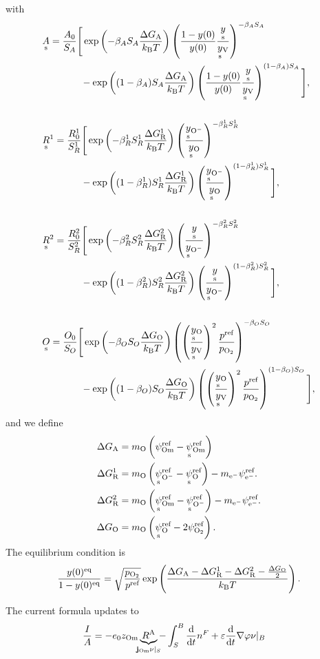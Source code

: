 \documentclass{article}
\numberwithin{equation}{section}
\newcommand{\us}[1]{\underset{\textrm{s}}{#1}{}}
\def\kB{k_\mathrm{B}}
\def\Ox{\mathrm{O}}
\newcommand{\Omin}{{\ce{O-}}}
\def\Om{\mathrm{Om}}
\newcommand{\OO}{{\ce{O2}}}
\newcommand{\dd}{{\mathrm{d}}}
\def\eM{\mathrm{e^-}}
\def\ys{\us y}
\newcommand{\ysV}{\us y_{\textrm{V}}}
\newcommand{\yOmin}{\us y_{\ce{O-}}}
\def\y0{y(0)}
\def\yOs{\us y_\textrm{O}}
\def\A0{A_0}
\def\R0{R_0}
\def\K0{O_0}
\def\DGA{\Delta G_\textrm{A}  }
\def\DGR{\Delta G_\textrm{R}  }
\def\DGO{\Delta G_\textrm{O}  }
\def\betaA{\beta_A}
\def\betaR{\beta_R}
\def\betaO{\beta_O}
\def\SA{S_A}
\def\SR{S_R}
\def\SO{S_O}
\def\eq{\textrm{eq}}
\def\REF{\textrm{ref}}
\begin{document}
with
\begin{subequations}
\begin{align}
&\us A
=
\frac{\A0}{\SA}
\Bigg[
	\exp
	\left(
		{-\betaA \SA \frac{\DGA}{\kB T}}
	\right)
	\left(
		\frac{1 - \y0}{\y0}
		\frac{\ys}{\ysV}
	\right)^{-\betaA \SA}
\\ \nonumber
	&\quad \quad \quad \quad	
	-
	\exp
	\left(
		{(1-\betaA) \SA \frac{\DGA}{\kB T}}
	\right)
	\left(
		\frac{1 - \y0 }{\y0}
		\frac{\ys}{\ysV}
	\right)^{(1-\betaA) \SA}
\Bigg],
\\ \nonumber
\\
&\us R^1
=
\frac{\R0^1}{\SR^1}
\Bigg[
	\exp
	\left(
		{-\betaR^1 \SR^1 \frac{\DGR^1}{\kB T}}
	\right)
	\left(
		\frac{\yOmin}{\yOs}
	\right)^{-\betaR^1 \SR^1}
\\ \nonumber
	& \quad \quad \quad \quad	
	-
	\exp
	\left(
		{(1 - \betaR^1) \SR^1 \frac{\DGR^1}{\kB T}}
	\right)
	\left(
		\frac{\yOmin}{\yOs}
	\right)^{(1-\betaR^1) \SR^1}
\Bigg],
\\ \nonumber
\\
&\us R^2
=
\frac{\R0^2}{\SR^2}
\Bigg[
	\exp
	\left(
		{-\betaR^2 \SR^2 \frac{\DGR^2}{\kB T}}
	\right)
	\left(
		\frac{\ys}{\yOmin}
	\right)^{-\betaR^2 \SR^2}
\\ \nonumber
	& \quad \quad \quad \quad	
	-
	\exp
	\left(
		{(1 - \betaR^2) \SR^2 \frac{\DGR^2}{\kB T}}
	\right)
	\left(
		\frac{\ys}{\yOmin}
	\right)^{(1-\betaR^2) \SR^2}
\Bigg],
\\ \nonumber
\\
&\us O
=
\frac{\K0}{\SO}
\Bigg[
	\exp
	\left(
		{-\betaO \SO \frac{\DGO}{\kB T}}
	\right)
	\left(
		\left(
			\frac{\yOs}{\ysV}
		\right)^2
   \frac{p^\REF}{p_\OO}
	\right)^{-\betaO \SO}
\\ \nonumber
	&\quad \quad \quad \quad	
	-
	\exp
	\left(
		{(1-\betaO) \SO \frac{\DGO}{\kB T}}
	\right)
	\left(
		\left(
			\frac{\yOs}{\ysV}
		\right)^2
    \frac{p^\REF}{p_\OO}
	\right)^{(1 - \betaO) \SO}
\Bigg],
\end{align}
\end{subequations}
and we define
\begin{subequations}
\begin{align}
\DGA
&=
m_\Ox
\left(
	\psi_{\textrm{Om}}^\REF
	-
	\us \psi_{\textrm{Om}}^\REF
\right)
\\
\DGR^1
&= 
m_\Ox
\left(
	\us \psi_\Omin^\REF
	-
	\us \psi_\Ox^\REF
\right)
-
m_\eM \psi_\eM^\REF.
\\
\DGR^2
&= 
m_\Ox
\left(
	\us \psi_\Om^\REF
	-
	\us \psi_\Omin^\REF
\right)
-
m_\eM \psi_\eM^\REF.
\\
\DGO
&= 
m_\Ox
\left(
	\us \psi_{\Ox}^\REF
	-
	2 \psi_{\OO}^\REF
\right).
\end{align}
\end{subequations}
The equilibrium condition is
\begin{subequations}
\begin{align}
    \frac{\y0^\eq}{1-\y0^\eq} = \sqrt{\frac{p_\OO}{p^\REF}} \exp
\left(
	\frac{\DGA - \DGR^1 - \DGR^2 - \frac{\DGO}{2}}{\kB T}
\right).
\end{align}
\end{subequations}

The current formula updates to
\begin{align}
    \frac{I}{A} &= - e_0  z_\Om \underbrace{R^{\textrm{A}}}_{\mathclap{\mathbf{j}_\Om\nu|_S}}
                     - \int_S^B \frac{\dd}{\dd t} n^F
                     +\varepsilon\frac{\dd}{\dd t}\nabla\varphi\nu|_B 
    \label{}
\end{align}
\end{document}

